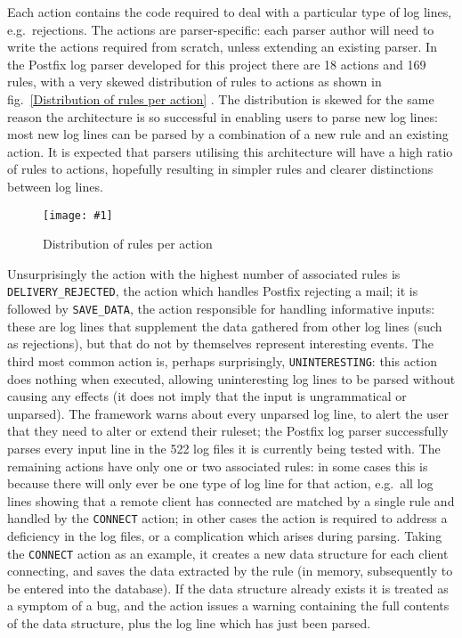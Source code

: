 \documentclass[draft]{svmult}
\newcommand{\showgraph}[3]{%
    \begin{figure}[hbtp]%
        \caption{#2}\label{#3}%
        \texttt{[image: \#1]}%
    \end{figure}%
}
\newcommand{\refwithlabel}[2]{%
    #1~\vref{#2}%
}
\newcommand{\graphref}[1]{%
    \refwithlabel{fig.}{#1}%
}
\newcommand{\numberOFrules}[0]{%
    169%
}
\newcommand{\numberOFlogFILESall}[0]{%
    522%
}
\newcommand{\numberOFactions}[0]{%
    18%
}
\begin{document}
Each action contains the code required to deal with a particular type of
log lines, e.g.\ rejections.  The actions are parser-specific: each parser
author will need to write the actions required from scratch, unless
extending an existing parser.  In the Postfix log parser developed for this
project there are \numberOFactions{} actions and \numberOFrules{} rules,
with a very skewed distribution of rules to actions as shown in
\graphref{Distribution of rules per action}.  The distribution is skewed
for the same reason the architecture is so successful in enabling users to
parse new log lines: most new log lines can be parsed by a combination of a
new rule and an existing action.  It is expected that parsers utilising
this architecture will have a high ratio of rules to actions, hopefully
resulting in simpler rules and clearer distinctions between log lines.
\showgraph{build/graph-action-distribution}{Distribution of rules per
action}{Distribution of rules per action} Unsurprisingly the action with
the highest number of associated rules is \texttt{DELIVERY\_REJECTED}, the action
which handles Postfix rejecting a mail; it is followed by
\texttt{SAVE\_DATA}, the action responsible for handling informative
inputs: these are log lines that supplement the data gathered from other
log lines (such as rejections), but that do not by themselves represent
interesting events.  The third most common action is, perhaps surprisingly,
\texttt{UNINTERESTING}: this action does nothing when executed,
allowing uninteresting log lines to be parsed without causing any effects
(it does not imply that the input is
ungrammatical or unparsed).  The framework warns about every unparsed log
line, to alert the user that they need to alter or extend their ruleset;
the Postfix log parser successfully parses every input line in the
\numberOFlogFILESall{} log files it is currently being tested with.  The
remaining actions have only one or two associated rules: in some cases this
is because there will only ever be one type of log line for that action,
e.g.\ all log lines showing that a remote client has connected are matched
by a single rule and handled by the \texttt{CONNECT} action; in other cases
the action is required to address a deficiency in the log files, or a
complication which arises during parsing.  Taking the \texttt{CONNECT}
action as an example, it creates a new data structure for each client
connecting, and saves the data extracted by the rule (in memory,
subsequently to be entered into the database).  If the data structure
already exists it is treated as a symptom of a bug, and the action issues a
warning containing the full contents of the data structure, plus the log
line which has just been parsed.
\end{document}
